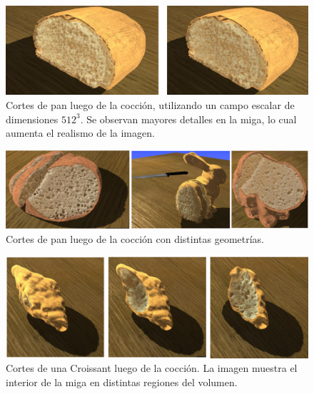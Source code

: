 \begin{figure}[!ht]
\begin{center}
\includegraphics[width=13cm]{figures/otherbread512}
\caption[Cortes de pan luego de la cocción, utilizando un campo escalar de dimensiones $512^{3}$]{Cortes de pan luego de la cocción, utilizando un campo escalar de dimensiones $512^{3}$. Se observan mayores detalles en la miga, lo cual aumenta el realismo de la imagen.}
\label{fg:renders2}
\end{center}
\end{figure}

\begin{figure}[!ht]
\begin{center}
\includegraphics[width=13cm]{figures/final}
\caption{Cortes de pan luego de la cocción con distintas geometrías.}
\label{fg:renders3}
\end{center}
\end{figure}

\begin{figure}[!ht]
\begin{center}
\includegraphics[width=13cm]{figures/croissant}
\caption[Cortes de una Croissant luego de la cocción]{Cortes de una Croissant luego de la cocción. La imagen muestra el interior de la miga en distintas regiones del volumen.}
\label{fg:croissant}
\end{center}
\end{figure}

